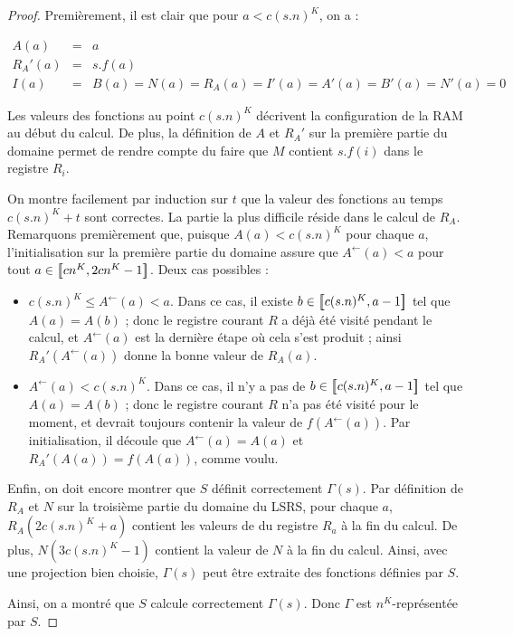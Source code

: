 \begin{appendices}
\begin{proof}
			Premièrement, il est clair que pour $a < c(s.n)^K$, on a :
			
	 
			\begin{eqnarray}
			A(a) & = & a \\
			R_A'(a) & = & s.f(a) \\
			I(a) & = & B(a) = N(a) = R_A(a) = I'(a) = A'(a) = B'(a) = N'(a) = 0
			\end{eqnarray}
			
			Les valeurs des fonctions au point $c(s.n)^K$ décrivent la configuration de la RAM au début du calcul. De plus, la définition de $A$ et $R_A'$ sur la première partie du domaine permet de rendre compte du faire que $M$ contient $s.f(i)$ dans le registre $R_i$.
			
			On montre facilement par induction sur $t$ que la valeur des fonctions au temps $c(s.n)^K+t$ sont correctes. La partie la plus difficile réside dans le calcul de $R_A$. Remarquons premièrement que, puisque $A(a) < c(s.n)^K$ pour chaque $a$, l'initialisation sur la première partie du domaine assure que $A^{\leftarrow}(a) < a$ pour tout $a \in \left[\,\!\!\!\left[ cn^K , 2cn^K-1 \right]\,\!\!\!\right]$. Deux cas possibles :
			
			\begin{itemize}[itemsep=-1mm]
				\item 	
				$c(s.n)^K \leqslant A^{\leftarrow}(a) < a$. Dans ce cas, il existe $b \in \left[\,\!\!\!\left[ c(s.n)^K , a-1 \right]\,\!\!\!\right]$ tel que $A(a) = A(b)$ ; donc le registre courant $R$ a déjà été visité pendant le calcul, et $A^{\leftarrow}(a)$ est la dernière étape où cela s'est produit ; ainsi $R_A'\left(A^{\leftarrow}(a)\right)$ donne la bonne valeur de $R_A(a)$.
				
				\item 
				$A^{\leftarrow}(a) < c(s.n)^K$. Dans ce cas, il n'y a pas de $b \in \left[\,\!\!\!\left[ c(s.n)^K , a-1 \right]\,\!\!\!\right]$ tel que $A(a) = A(b)$ ; donc le registre courant $R$ n'a pas été visité pour le moment, et devrait toujours contenir la valeur de $f(A^{\leftarrow}(a))$\footnotemark. Par initialisation, il découle que $A^{\leftarrow}(a) = A(a)$ et $R_A'(A(a)) = f(A(a))$, comme voulu.
				
			\end{itemize}
			
			Enfin, on doit encore montrer que $S$ définit correctement $\Gamma(s)$. Par définition de $R_A$ et $N$ sur la troisième partie du domaine du LSRS, pour chaque $a$, $R_A\left( 2 c(s.n)^K + a \right)$ contient les valeurs de du registre $R_a$ à la fin du calcul. De plus, $N(3c(s.n)^K-1)$ contient la valeur de $N$ à la fin du calcul. Ainsi, avec une projection bien choisie, $\Gamma(s)$ peut être extraite des fonctions définies par $S$. 
			
			Ainsi, on a montré que $S$ calcule correctement $\Gamma(s)$. Donc $\Gamma$ est $n^K$-représentée par $S$.
			
		\end{proof}
		
		
		
	\end{appendices}
	
	
	
	